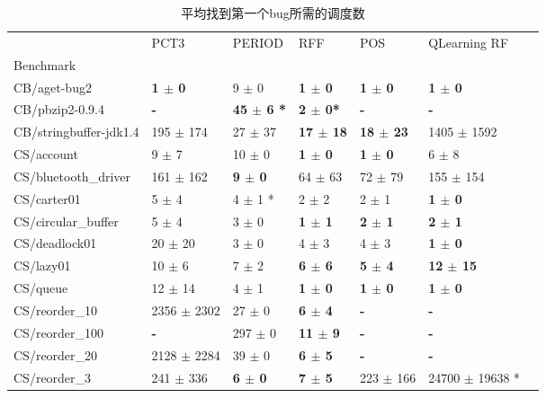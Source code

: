 

\begin{table}
\begin{spacing}{1.5}
\caption{\label{tab:sample}平均找到第一个bug所需的调度数}
\begin{tabular}{lllllll}
\toprule
 & PCT3 & PERIOD & RFF & POS & QLearning RF \\
Benchmark &  &  &  &  &  &  \\
\midrule
CB/aget-bug2 & \textbf{ 1  $\pm$ 0  } & 9  $\pm$ 0  & \textbf{ 1  $\pm$ 0  } & \textbf{ 1  $\pm$ 0  } & \textbf{ 1  $\pm$ 0  } \\
CB/pbzip2-0.9.4 & \textbf{ - } & \textbf{ 45  $\pm$ 6 * } & \textbf{ 2  $\pm$ 0* } & \textbf{ - } & \textbf{ - } \\
CB/stringbuffer-jdk1.4 & 195  $\pm$ 174  & 27  $\pm$ 37  & \textbf{ 17  $\pm$ 18  } & \textbf{ 18  $\pm$ 23  } & 1405  $\pm$ 1592 \\
CS/account & 9  $\pm$ 7  & 10  $\pm$ 0  & \textbf{ 1  $\pm$ 0  } & \textbf{ 1  $\pm$ 0  } & 6  $\pm$ 8  \\
CS/bluetooth\_driver & 161  $\pm$ 162  & \textbf{ 9  $\pm$ 0  } & 64  $\pm$ 63  & 72  $\pm$ 79  & 155  $\pm$ 154 \\
CS/carter01 & 5  $\pm$ 4  & 4  $\pm$ 1 * & 2  $\pm$ 2  & 2  $\pm$ 1  & \textbf{ 1  $\pm$ 0  } \\
CS/circular\_buffer & 5  $\pm$ 4  & 3  $\pm$ 0  & \textbf{ 1  $\pm$ 1  } & \textbf{ 2  $\pm$ 1  } & \textbf{ 2  $\pm$ 1  } \\
CS/deadlock01 & 20  $\pm$ 20  & 3  $\pm$ 0  & 4  $\pm$ 3  & 4  $\pm$ 3  & \textbf{ 1  $\pm$ 0  } \\
CS/lazy01 & 10  $\pm$ 6  & 7  $\pm$ 2  & \textbf{ 6  $\pm$ 6  } & \textbf{ 5  $\pm$ 4  } & \textbf{ 12  $\pm$ 15  } \\
CS/queue & 12  $\pm$ 14  & 4  $\pm$ 1  & \textbf{ 1  $\pm$ 0  } & \textbf{ 1  $\pm$ 0  } & \textbf{ 1  $\pm$ 0  } \\
CS/reorder\_10 & 2356  $\pm$ 2302  & 27  $\pm$ 0  & \textbf{ 6  $\pm$ 4  } & \textbf{ - } & \textbf{ - }  \\
CS/reorder\_100 & \textbf{ - } & 297  $\pm$ 0  & \textbf{ 11  $\pm$ 9  } & \textbf{ - } & \textbf{ - } \\
CS/reorder\_20 & 2128  $\pm$ 2284  & 39  $\pm$ 0  & \textbf{ 6  $\pm$ 5  } & \textbf{ - } & \textbf{ - } \\
CS/reorder\_3 & 241  $\pm$ 336  & \textbf{ 6  $\pm$ 0  } & \textbf{ 7  $\pm$ 5  } & 223  $\pm$ 166  & 24700  $\pm$ 19638 *  \\

\end{tabular}
\end{spacing}
\end{table}
